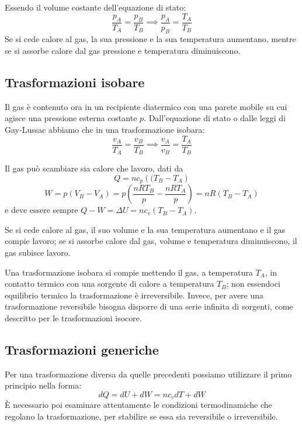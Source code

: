 \documentclass[class=book, crop=false, oneside, 12pt]{standalone}
\begin{document}
Essendo il volume costante dell'equazione di stato:
\begin{equation*}
    \frac{p_A}{T_A} = \frac{p_B}{T_B} \implies \frac{p_A}{p_B} = \frac{T_A}{T_B}
\end{equation*}
Se si cede calore al gas, la sua pressione e la sua temperatura aumentano, mentre se si assorbe calore dal gas pressione e temperatura diminuiscono.

\subsection{Trasformazioni isobare}

Il gas è contenuto ora in un recipiente diatermico con una parete mobile su cui agisce una pressione esterna costante \(p\).
Dall'equazione di stato o dalle leggi di Gay-Lussac abbiamo che in una trasformazione isobara:
\begin{equation*}
    \frac{v_A}{T_A} = \frac{v_B}{T_B} \implies \frac{v_A}{v_B} = \frac{T_A}{T_B}
\end{equation*}

Il gas può scambiare sia calore che lavoro, dati da 
\begin{equation*}
    Q = n c_p \left((T_B - T_A\right)
\end{equation*}
\begin{equation*}
    W = p (V_B - V_A) = p \left(\frac{n R T_B}{p} - \frac{n R T_A}{p}\right) = n R \left(T_B - T_A\right) 
\end{equation*}
e deve essere sempre \(Q - W = \Delta U = n c_v (T_B - T_A)\).

Se si cede calore al gas, il suo volume e la sua temperatura aumentano e il gas compie lavoro; se si assorbe calore dal gas, volume e temperatura diminuiscono, il gas subisce lavoro.

Una trasformazione isobara si compie mettendo il gas, a temperatura \(T_A\), in contatto termico con una sorgente di calore a temperatura \(T_B\); non essendoci equilibrio termico la trasformazione è irreversibile. 
Invece, per avere una trasformazione reversibile bisogna disporre di una serie infinita di sorgenti, come descritto per le trasformazioni isocore. 

\subsection{Trasformazioni generiche}

Per una trasformazione diversa da quelle precedenti possiamo utilizzare il primo principio nella forma:
\begin{equation}
    d Q = d U + d W = n c_v d T + d W
\end{equation}
È necessario poi esaminare attentamente le condizioni termodinamiche che regolano la trasformazione, per stabilire se essa sia reversibile o irreversibile.
\end{document}
